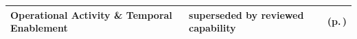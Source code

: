 \begin{longtable}{|>{\raggedright\arraybackslash}p{0.38\TableWidth}|>{\raggedright\arraybackslash}p{0.3\TableWidth}|>{\raggedright\arraybackslash}p{0.32\TableWidth}|}
Operational Activity \& Temporal Enablement & superseded by reviewed capability & \nameref{cap:bec-operational-activity-temporal-enablement} (p.\,\pageref{cap:bec-operational-activity-temporal-enablement})\\\hline
\end{longtable}\endgroup
